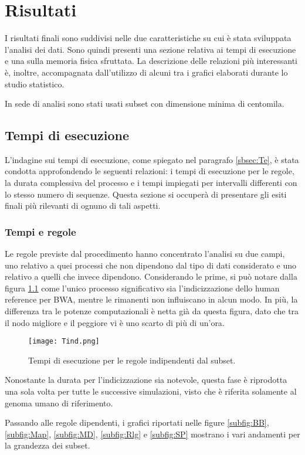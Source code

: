 \chapter{Risultati}
\label{cap:3}
I risultati finali sono suddivisi nelle due caratteristiche su cui è stata sviluppata l'analisi dei dati.
Sono quindi presenti una sezione relativa ai tempi di esecuzione e una sulla memoria fisica sfruttata. 
La descrizione delle relazioni più interessanti è, inoltre, accompagnata dall'utilizzo di alcuni tra i grafici elaborati durante lo studio statistico.

In sede di analisi sono stati usati subset con dimensione minima di centomila.

\section{Tempi di esecuzione}
L'indagine sui tempi di esecuzione, come spiegato nel paragrafo \ref{sbsec:Te}, è stata condotta approfondendo le seguenti relazioni: i tempi di esecuzione per le regole, la durata complessiva del processo e i tempi impiegati per intervalli differenti con lo stesso numero di sequenze. 
Questa sezione si occuperà di presentare gli esiti finali più rilevanti di ognuno di tali aspetti.

\subsection{Tempi e regole}
Le regole previste dal procedimento hanno concentrato l'analisi su due campi, uno relativo a quei processi che non dipendono dal tipo di dati considerato e uno relativo a quelli che invece dipendono. 
Considerando le prime, si può notare dalla figura \ref{fig:Tind} come l'unico processo significativo sia l'indicizzazione dello human reference per BWA, mentre le rimanenti non influiscano in alcun modo. 
In più, la differenza tra le potenze computazionali è netta già da questa figura, dato che tra il nodo migliore e il peggiore vi è uno scarto di più di un'ora.
\begin{figure}[H]
\centering
\texttt{[image: Tind.png]}
\caption{Tempi di esecuzione per le regole indipendenti dal subset.}
\label{fig:Tind}
\end{figure}
Nonostante la durata per l'indicizzazione sia notevole, questa fase è riprodotta una sola volta per tutte le successive simulazioni, visto che è riferita solamente al genoma umano di riferimento.

Passando alle regole dipendenti, i grafici riportati nelle figure \ref{subfig:BB}, \ref{subfig:Map}, \ref{subfig:MD}, \ref{subfig:Rlg} e \ref{subfig:SP} mostrano i vari andamenti per la grandezza dei subset.

